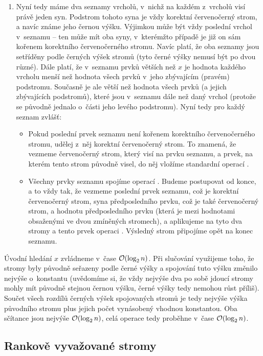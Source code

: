\begin{enumerate}
\item Nyní tedy máme dva seznamy vrcholů, v~nichž na každém z~vrcholů visí
právě jeden syn. Podstrom tohoto syna je vždy korektní červenočerný strom, a
navíc známe jeho černou výšku. Výjimkou může být vždy poslední vrchol v~seznamu
-- ten může mít oba syny, v~kterémžto případě je již on sám kořenem korektního
červenočerného stromu. Navíc platí, že oba seznamy jsou setříděny podle černých
výšek stromů (tyto černé výšky nemusí být po dvou různé). Dále platí, že
v~seznamu prvků větších než $x$ je hodnota každého vrcholu menší než hodnota všech
prvků v~jeho zbývajícím (pravém) podstromu. Současně je ale větší než hodnota všech prvků
(a jejich zbývajících podstromů), které jsou v~seznamu dále než daný vrchol (protože se
původně jednalo o~části jeho levého podstromu). Nyní tedy pro každý seznam
zvlášť:
\begin{itemize}

\item Pokud poslední prvek seznamu není kořenem korektního červenočerného
stromu, udělej z~něj korektní červenočerný strom. To znamená, že vezmeme
červenočerný strom, který visí na prvku seznamu, a prvek, na kterém tento strom původně
visel, do něj vložíme standardní operací .

\item Všechny prvky seznamu spojíme operací . Budeme postupovat od
konce, a to vždy tak, že vezmeme poslední prvek seznamu, což je korektní
červenočerný strom, syna předposledního prvku, což je také červenočerný strom,
a hodnotu předposledního prvku (která je mezi hodnotami obsaženými ve dvou zmíněných stromech), a aplikujeme na tyto dva stromy
a tento prvek operaci . Výsledný strom připojíme opět na konec
seznamu. 

\end{itemize}
\end{enumerate}

Úvodní hledání $x$ zvládneme v~čase $\o(\log n)$. Při slučování využijeme
toho, že stromy byly původně seřazeny podle černé výšky a spojování tuto výšku
změnilo nejvýše o~konstantu (uvědomíme si, že vždy nejvýše dva po sobě jdoucí
stromy mohly mít původně stejnou černou výšku, černé výšky tedy nemohou růst
příliš). Součet všech rozdílů černých výšek spojovaných stromů je tedy nejvýše
výška původního stromu plus jejich počet vynásobený vhodnou konstantou. Oba sčítance jsou
nejvýše $\o(\log n)$, celá operace  tedy proběhne v~čase $\o(\log
n)$.

\subsection{Rankově vyvažované stromy}

